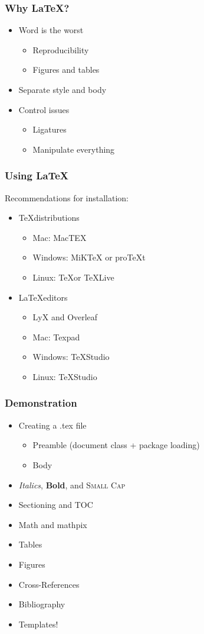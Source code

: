 \documentclass{beamer}\usepackage[]{graphicx}\usepackage[]{color}
\begin{document}
		\begin{frame}
			\frametitle{Why \LaTeX?}
\begin{itemize}[<+->]
		\item Word is the worst
		\begin{itemize}
		\item Reproducibility
		\item Figures and tables
		\end{itemize}
		\item Separate style and body
		\item Control issues
		\begin{itemize}
		\item Ligatures
		\item Manipulate everything
		\end{itemize}
\end{itemize}
		\end{frame}
\begin{frame}
\frametitle{Using \LaTeX}
Recommendations for installation:
\begin{itemize}[<+->]
	\item \TeX distributions
	\begin{itemize} \item Mac: MacTEX
	\item Windows: MiKTeX or proTeXt
	\item Linux: \TeX  or TeXLive \end{itemize}
	\item \LaTeX editors
	\begin{itemize}
	\item LyX and Overleaf
	\item Mac: Texpad
	\item Windows: TeXStudio 
	\item Linux: TeXStudio
	\end{itemize}
	\end{itemize}
\end{frame}
\begin{frame}
\frametitle{Demonstration}
\begin{itemize}[<+->]
	\item{Creating a .tex file}
	\begin{itemize}
		\item Preamble (document class + package loading)
		\item Body
	\end{itemize}
\item \emph{Italics}, \textbf{Bold}, and \textsc{Small Cap}
\item{Sectioning and TOC}
\item{Math and mathpix}
\item Tables
\item Figures
\item Cross-References
\item Bibliography
\item Templates!
\end{itemize}
\end{frame}
\end{document}
